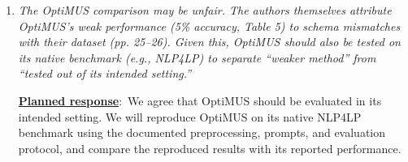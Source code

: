 \documentclass[11pt]{article}
\newcommand{\edit}[1]{{\color{hopkins-blue}\itshape #1}}
\newcommand{\planned}{\noindent\underline{\textbf{Planned response}}:\ }
\newcommand{\expected}{\noindent\textbf{Expected outputs.} }
\begin{document}
\begin{enumerate}[label=(AssoE.\arabic*),leftmargin=*]
\begin{enumerate}[label=(R2.Major.\arabic*),leftmargin=*]




\item \edit{The OptiMUS comparison may be unfair. The authors themselves attribute OptiMUS's weak performance (5\% accuracy, Table 5) to schema mismatches with their dataset (pp. 25--26). Given this, OptiMUS should also be tested on its native benchmark (e.g., NLP4LP) to separate ``weaker method'' from ``tested out of its intended setting.''}\label{R2-major-5}

\planned We agree that OptiMUS should be evaluated in its intended setting.
We will reproduce OptiMUS on its native NLP4LP benchmark using the documented
preprocessing, prompts, and evaluation protocol, and compare the reproduced
results with its reported performance.


\end{enumerate}
\end{enumerate}
\end{document}
